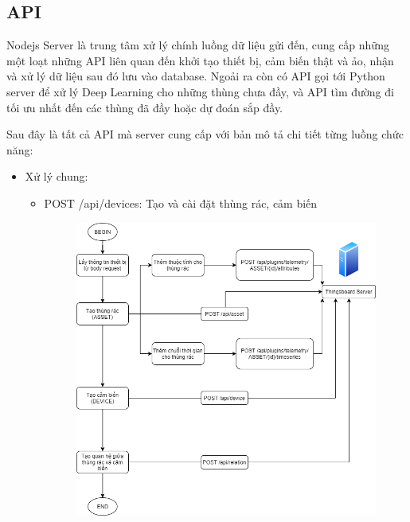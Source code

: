 \subsection{API}
Nodejs Server là trung tâm xử lý chính luồng dữ liệu gửi đến, cung cấp những một loạt những API liên quan đến khởi tạo thiết bị, cảm biến thật và ảo, nhận và xử lý dữ liệu sau đó lưu vào database. Ngoải ra còn có API gọi tới Python server để xử lý Deep Learning cho những thùng chưa đầy, và API tìm đường đi tối ưu nhất đến các thùng đã đầy hoặc dự đoán sắp đầy.

Sau đây là tất cả API mà server cung cấp với bản mô tả chi tiết từng luồng chức năng:
\begin{itemize}

    \item Xử lý chung:
    \begin{itemize}
        \item POST /api/devices: Tạo và cài đặt thùng rác, cảm biến
        \begin{itemize}
            \begin{figure}[H]
                \centering
                \includegraphics[width=\textwidth]{images/Khanh/Nodejs/Server_Create_Stimulate_Device.png}

\end{figure}
\end{itemize}
\end{itemize}
\end{itemize}
